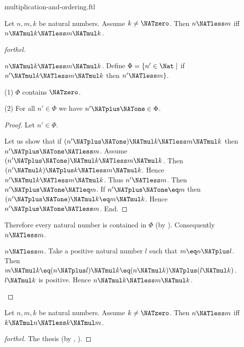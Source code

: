 \documentclass{naproche-library}
\begin{document}
\begin{smodule}[title=Multiplication and Ordering]{multiplication-and-ordering.ftl}

\begin{proposition}[forthel,id=ARITHMETIC_06_8817333933965312]
  Let $n, m, k$ be natural numbers.
  Assume $k \neq \NATzero$.
  Then $n \NATless m$ iff $n \NATmul k \NATless m \NATmul k$.
\end{proposition}
\begin{proof}[forthel]
  \begin{case}{$n \NATmul k \NATless m \NATmul k$.}
    Define $\Phi = \{ n' \in \Nat \mid$ if $n' \NATmul k \NATless m \NATmul k$ then $n' \NATless m \}$.

    (1) $\Phi$ contains $\NATzero$.

    (2) For all $n' \in \Phi$ we have $n' \NATplus \NATone \in \Phi$.
    \begin{proof}
      Let $n' \in \Phi$.

      Let us show that if $(n' \NATplus \NATone) \NATmul k \NATless m \NATmul k$ then $n' \NATplus \NATone \NATless m$.
        Assume $(n' \NATplus \NATone) \NATmul k \NATless m \NATmul k$.
        Then $(n' \NATmul k) \NATplus k \NATless m \NATmul k$.
        Hence $n' \NATmul k \NATless m \NATmul k$.
        Thus $n' \NATless m$.
        Then $n' \NATplus \NATone \NATleq m$.
        If $n' \NATplus \NATone \eq m$ then $(n' \NATplus \NATone) \NATmul k \eq m \NATmul k$.
        Hence $n' \NATplus \NATone \NATless m$.
      End.
    \end{proof}

    Therefore every natural number is contained in $\Phi$ (by ).
    Consequently $n \NATless m$.
  \end{case}

  \begin{case}{$n \NATless m$.}
    Take a positive natural number $l$ such that $m \eq n \NATplus l$.
    Then $m \NATmul k \eq (n \NATplus l) \NATmul k \eq (n \NATmul k) \NATplus (l \NATmul k)$.
    $l \NATmul k$ is positive.
    Hence $n \NATmul k \NATless m \NATmul k$.
  \end{case}
\end{proof}

\begin{corollary}[forthel,id=ARITHMETIC_06_5048640368279552]
  Let $n, m, k$ be natural numbers.
  Assume $k \neq \NATzero$.
  Then $n \NATless m$ iff $k \NATmul n \NATless k \NATmul m$.
\end{corollary}
\begin{proof}[forthel]
  The thesis (by , ).
\end{proof}


\end{smodule}
\end{document}
